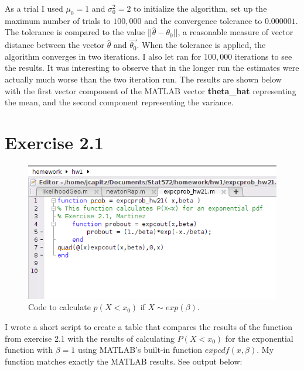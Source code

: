 \documentclass[12pt,a4paper]{article}
\begin{document}
As a trial I used $\mu_0=1$ and $\sigma^2_0=2$ to initialize the algorithm, set up the maximum number of trials to $100,000$ and the convergence tolerance to $0.000001$. The tolerance is compared to the value $||\hat{\theta}-\theta_0||$, a reasonable measure of vector distance between the vector $\hat{\theta}$ and $\vec{\theta_0}$. When the tolerance is applied, the algorithm converges in two iterations. I also let ran for $100,000$ iterations to see the results. It was interesting to observe that in the longer run the estimates were actually much worse than the two iteration run. The results are shown below with the first vector component of the MATLAB vector \textbf{theta\_hat} representing the mean, and the second component representing the variance.

\FloatBarrier



\section*{Exercise 2.1}

\begin{figure}[ht!]
\includegraphics[scale=.70]{code_21.png}
\caption{Code to calculate $p(X<x_0)$ if $X\sim exp(\beta)$.}
\label{fig1:2.1}
\end{figure}

I wrote a short script to create a table that compares the results of the function from exercise 2.1 with the results of calculating $P(X<x_0)$ for the exponential function with $\beta=1$ using MATLAB's built-in function $expcdf(x,\beta)$. My function matches exactly the MATLAB results. See output below:
\end{document}
